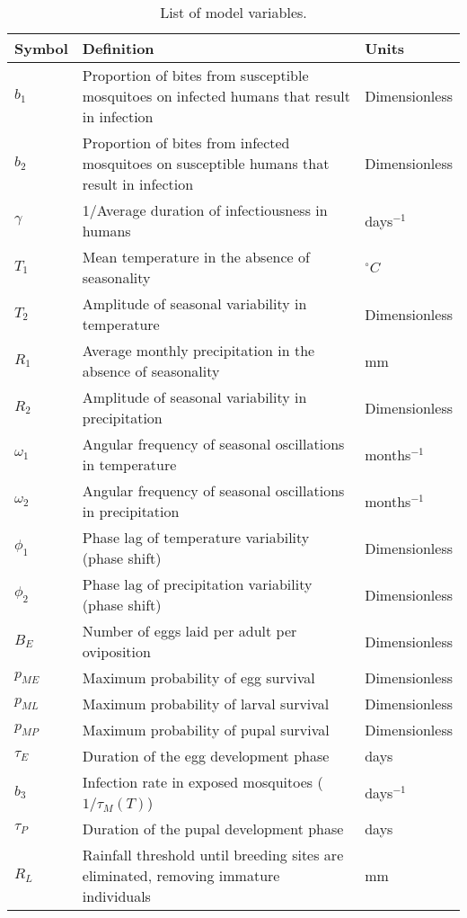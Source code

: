 \documentclass[3p,times]{elsarticle}
\begin{document}
\begin{table}[h]
\caption{List of model variables.}
\centering
\begin{tabular}{|l l l|}
\hline
Symbol & Definition & Units \\ \hline
$b_1$  & Proportion of bites from susceptible mosquitoes on infected humans that result in infection & Dimensionless \\  \hline
$b_2$   & Proportion of bites from infected mosquitoes on susceptible humans that result in infection & Dimensionless \\ \hline
$\gamma$ &  1/Average duration of infectiousness in humans & days$^{-1}$  \\ \hline
$T_1$  & Mean temperature in the absence of seasonality & $^\circ C$ \\ \hline
$T_2$  & Amplitude of seasonal variability in temperature & Dimensionless \\ \hline
$R_1$  & Average monthly precipitation in the absence of seasonality & mm \\ \hline
$R_2$  & Amplitude of seasonal variability in precipitation & Dimensionless \\ \hline
$\omega_1$  & Angular frequency of seasonal oscillations in temperature & months$^{-1}$ \\ \hline
$\omega_2$  & Angular frequency of seasonal oscillations in precipitation & months$^{-1}$ \\ \hline
$\phi_1$  & Phase lag of temperature variability (phase shift) & Dimensionless \\ \hline
$\phi_2$  & Phase lag of precipitation variability (phase shift) & Dimensionless \\ \hline
$B_E$  & Number of eggs laid per adult per oviposition & Dimensionless \\ \hline
$p_{ME}$  & Maximum probability of egg survival & Dimensionless \\ \hline
$p_{ML}$  & Maximum probability of larval survival & Dimensionless \\ \hline
$p_{MP}$  & Maximum probability of pupal survival & Dimensionless \\ \hline
$\tau_E$  & Duration of the egg development phase & days \\ \hline
$b_3$  & Infection rate in exposed mosquitoes ($1/\tau_M(T)$) &  days$^{-1}$ \\ \hline
$\tau_P$  & Duration of the pupal development phase & days \\ \hline
$R_L$  & Rainfall threshold until breeding sites are eliminated, removing immature individuals & mm \\ \hline

\end{tabular}
\end{table}
\end{document}
